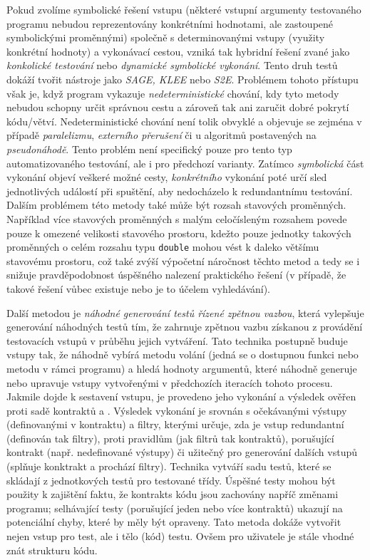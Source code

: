 \documentclass[czech, ma, kiv, he, iso690numb, pdf, viewonly]{fasthesis}
\begin{document}
        Pokud zvolíme symbolické řešení vstupu (některé vstupní argumenty testovaného programu nebudou reprezentovány konkrétními hodnotami, ale zastoupené symbolickými proměnnými) společně s determinovanými vstupy (využity konkrétní hodnoty) a vykonávací cestou, vzniká tak hybridní řešení zvané jako \emph{konkolické testování} nebo \emph{dynamické symbolické vykonání}. Tento druh testů dokáží tvořit nástroje jako \textit{SAGE, KLEE} nebo \textit{S2E}. Problémem tohoto přístupu však je, když program vykazuje \emph{nedeterministické} chování, kdy tyto metody nebudou schopny určit správnou cestu a zároveň tak ani zaručit dobré pokrytí kódu/větví. Nedeterministické chování není tolik obvyklé a objevuje se zejména v případě \textit{paralelizmu}, \textit{externího přerušení} či u algoritmů postavených na \textit{pseudonáhodě}. \cite{nlab:nondeterministic_computation} Tento problém není specifický pouze pro tento typ automatizovaného testování, ale i pro předchozí varianty. Zatímco \emph{symbolická} část vykonání objeví veškeré možné cesty, \emph{konkrétního} vykonání poté určí sled jednotlivých událostí při spuštění, aby nedocházelo k redundantnímu testování. \cite{aldrich2019concolic} Dalším problémem této metody také může být rozsah stavových proměnných. Například více stavových proměnných s malým celočísleným rozsahem povede pouze k omezené velikosti stavového prostoru, kdežto pouze jednotky takových proměnných o celém rozsahu typu \verb|double| mohou vést k daleko většímu stavovému prostoru, což také zvýší výpočetní náročnost těchto metod a tedy se i snižuje pravděpodobnost úspěšného nalezení praktického řešení (v případě, že takové řešení vůbec existuje nebo je to účelem vyhledávání). \cite{concolic_chalenges_2019} \cite{engler2006exe} \cite{sen2005cute} \cite{zhou2006safedrive}

        Další metodou je \textit{náhodné generování testů řízené zpětnou vazbou}, která vylepšuje generování náhodných testů tím, že zahrnuje zpětnou vazbu získanou z provádění testovacích vstupů v průběhu jejich vytváření. Tato technika postupně buduje vstupy tak, že náhodně vybírá metodu volání (jedná se o dostupnou funkci nebo metodu v rámci programu) a hledá hodnoty argumentů, které náhodně generuje nebo upravuje vstupy vytvořenými v předchozích iteracích tohoto procesu. Jakmile dojde k sestavení vstupu, je provedeno jeho vykonání a výsledek ověřen proti sadě \gls{kontrakt}ů a . Výsledek vykonání je srovnán s očekávanými výstupy (definovanými v kontraktu) a filtry, kterými určuje, zda je vstup redundantní (definován tak filtry), proti pravidlům (jak filtrů tak kontraktů), porušující \gls{kontrakt} (např. nedefinované výstupy) či užitečný pro generování dalších vstupů (splňuje konktrakt a prochází filtry). Technika vytváří sadu testů, které se skládají z jednotkových testů pro testované třídy. Úspěšné testy mohou být použity k zajištění faktu, že \glspl{kontrakt} kódu jsou zachovány napříč změnami programu; selhávající testy (porušující jeden nebo více kontraktů) ukazují na potenciální chyby, které by měly být opraveny. Tato metoda dokáže vytvořit nejen vstup pro test, ale i tělo (kód) testu. Ovšem pro uživatele je stále vhodné znát strukturu kódu. \cite{FeedbackDirectedRT}
\end{document}
